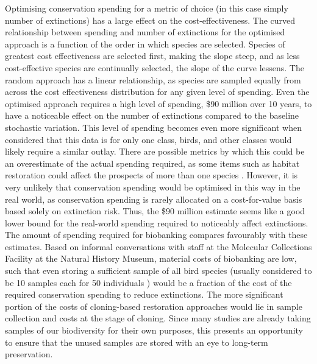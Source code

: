 \documentclass[12pt]{article}
\begin{document}
	Optimising conservation spending for a metric of choice
	(in this case simply number of extinctions)
	has a large effect on the cost-effectiveness.
	The curved relationship between spending and number of extinctions for the
	optimised approach is a function of the order in which species are selected.
	Species of greatest cost effectiveness are selected first,
	making the slope steep, and as less cost-effective species are continually
	selected, the slope of the curve lessens. The random approach
	has a linear relationship, as species are sampled equally
	from across the cost effectiveness distribution for any given level of spending.
	Even the optimised approach requires a high level of spending,
	\$90 million over 10 years, to have a noticeable
	effect on the number of extinctions compared to the baseline stochastic variation.
	This level of spending becomes even more significant when considered that
	this data is for only one class, birds, and other classes would likely require
	a similar outlay. There are possible metrics by which this
	could be an overestimate of the actual spending required, as some
	items such as habitat restoration could affect the prospects
	of more than one species
	\citep{mccarthyFinancialCostsMeeting2012}. However, it is very unlikely that
	conservation spending would be optimised in this way in the real world, as
	conservation spending is rarely allocated on a cost-for-value basis
	based solely on extinction risk. Thus, the \$90 million estimate
	seems like a good lower bound for the real-world spending required
	to noticeably affect extinctions.
	The amount of spending required for biobanking compares
	favourably with these estimates. Based on informal conversations with staff at the
	Molecular Collections Facility at the Natural History Museum, material costs
	of biobanking are low, such that even storing a sufficient sample of all bird
	species (usually considered to be 10 samples each for 50 individuals
	\citep{harwoodDevelopingImplementingPrioritisation2021}) would be
	a fraction of the cost of the required conservation spending to reduce
	extinctions. The more significant portion of the costs of cloning-based
	restoration approaches would lie in sample collection and costs at the
	stage of cloning. Since many studies are already taking samples of our
	biodiversity for their own purposes, this presents an opportunity to ensure
	that the unused samples are stored with an eye to long-term
	preservation.
	
\end{document}
